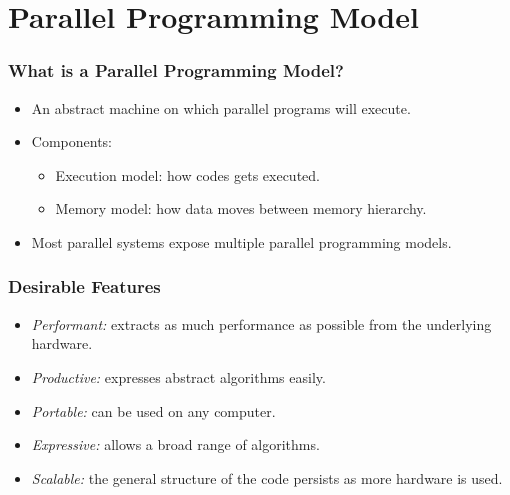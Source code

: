 \section{Parallel Programming Model}
\begin{frame}\frametitle{What is a Parallel Programming Model?}

\vspace{5mm}
\begin{itemize}
\item {\Large An abstract machine on which parallel programs will execute.}
\vspace{5mm}
\item {\Large Components:}
\begin{itemize}
\item {\large Execution model: how codes gets executed.}
\vspace{2mm}
\item {\large Memory model: how data moves between memory hierarchy.}
\end{itemize}
\vspace{5mm}
\item {\Large Most parallel systems expose multiple parallel programming models.}
\end{itemize}

\end{frame}

\begin{frame}\frametitle{Desirable Features}

\vspace{5mm}
\begin{itemize}
\item {\Large \textit{Performant:} extracts as much performance as possible from the underlying hardware.}
\vspace{5mm}
\item {\Large \textit{Productive:} expresses abstract algorithms easily.}
\vspace{5mm}
\item {\Large \textit{Portable:} can be used on any computer.}
\vspace{5mm}
\item {\Large \textit{Expressive:} allows a broad range of algorithms.}
\vspace{5mm}
\item {\Large \textit{Scalable:} the general structure of the code persists as more hardware is used.}
\end{itemize}

\end{frame}

